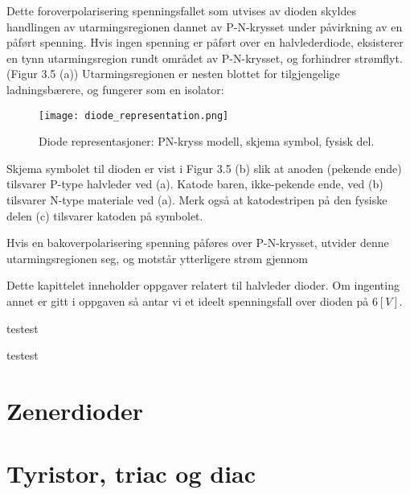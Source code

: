 \documentclass[12pt]{report}
\begin{document}
Dette foroverpolarisering spenningsfallet som utvises av dioden skyldes handlingen av utarmingsregionen dannet av P-N-krysset under påvirkning av en påført spenning. Hvis ingen spenning er påført over en halvlederdiode, eksisterer en tynn utarmingsregion rundt området av P-N-krysset, og forhindrer strømflyt. (Figur 3.5 (a)) Utarmingsregionen er nesten blottet for tilgjengelige ladningsbærere, og fungerer som en isolator:

\begin{figure}[h]
\centering
\texttt{[image: diode\_representation.png]}
\caption{Diode representasjoner: PN-kryss modell, skjema symbol, fysisk del.}
\end{figure}

Skjema symbolet til dioden er vist i Figur 3.5 (b) slik at anoden (pekende ende) tilsvarer P-type halvleder ved (a). Katode baren, ikke-pekende ende, ved (b) tilsvarer N-type materiale ved (a). Merk også at katodestripen på den fysiske delen (c) tilsvarer katoden på symbolet.

Hvis en bakoverpolarisering spenning påføres over P-N-krysset, utvider denne utarmingsregionen seg, og motstår ytterligere strøm gjennom 




Dette kapittelet inneholder oppgaver relatert til halvleder dioder. Om ingenting annet er gitt i oppgaven så antar vi et ideelt spenningsfall over dioden på $6[V]$.\\


\printsolutions[section]


\begin{question}[name=Spørsmål, subtitle=The subtitle of the question]
testest
\end{question}

\begin{question}[name=Spørsmål, subtitle=The subtitle of the question]
testest
\end{question}

\newpage

\section{Zenerdioder}

\printsolutions[section]


\section{Tyristor, triac og diac}
\end{document}
